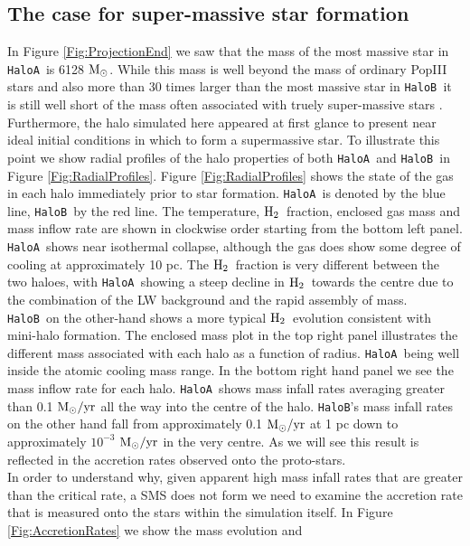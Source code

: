 \documentclass[graphics, twocolumn, usenatbib]{mn2e}
\newcommand{\msolarc} {$\rm{M_{\odot}}$}
\newcommand{\msolaryr} {$\rm{M_{\odot}/yr}~$}
\newcommand{\molH} {$\rm{H_2}$~}
\newcommand{\ha} {\texttt{HaloA~}}
\newcommand{\hb} {\texttt{HaloB~}}
\newcommand{\hbc} {\texttt{HaloB}}
\begin{document}
\subsection{The case for super-massive star formation}
In Figure \ref{Fig:ProjectionEnd} we saw that the mass of the most massive star in \ha is
6128 \msolarc. While this mass is well beyond the mass of ordinary PopIII stars \citep{Turk_2009, Greif_2011, Wise_2012b, Crosby_2013, Susa_2014, Hirano_2014, Stacy_2016} and also more than 30 times
larger than the most massive star in \hb it is still well short of the mass often associated with
truely super-massive stars \citep[e.g.][]{Woods_2018}. Furthermore, the halo simulated here appeared
at first glance to present near ideal initial conditions in which to form a supermassive star.
To illustrate this point we show radial profiles of the halo properties of both \ha and \hb in
Figure \ref{Fig:RadialProfiles}. Figure \ref{Fig:RadialProfiles} shows the state of the gas in
each halo immediately prior to star formation. \ha is denoted by the blue line, \hb by the red line.
The temperature, \molH fraction, enclosed gas mass and mass inflow rate are shown in clockwise order
starting from the bottom left panel. \\
\indent \ha shows near isothermal collapse, although the gas does
show some degree of cooling at approximately 10 pc. The \molH fraction is very different between
the two haloes, with \ha showing a steep decline in \molH towards the centre due to the combination
of the LW background and the rapid assembly of mass. \hb on the other-hand shows a more typical
\molH evolution consistent with mini-halo formation. The enclosed mass plot in the top right panel
illustrates the different mass associated with each halo as a function of radius. \ha being well
inside the atomic cooling mass range. In the bottom right hand panel we see the mass inflow rate for
each halo. \ha shows mass infall rates averaging greater than 0.1 \msolaryr all the way into the
centre of the halo. \hbc's mass infall rates on the other hand fall from approximately
0.1 \msolaryr at 1 pc down to approximately $10^{-3}$ \msolaryr in the very centre. As we will see
this result is reflected in the accretion rates observed onto the proto-stars. \\
\indent In order to understand why, given apparent high mass infall rates that are greater than the
critical rate, a SMS does not form we need to examine the accretion rate that is measured onto the
stars within the simulation itself. In Figure \ref{Fig:AccretionRates} we show the mass evolution and
\end{document}
